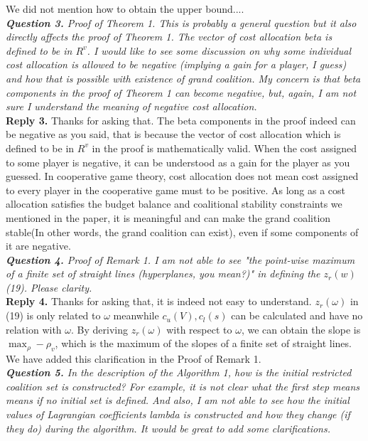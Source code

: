 \documentclass[11pt]{article}
\begin{document}
We did not mention how to obtain the upper bound....
\\[4mm]
%
%
%
\noindent \textit{\textbf{Question 3.}
Proof of Theorem 1. This is probably a general question but it also directly affects the proof of Theorem 1. The vector of cost allocation beta is defined to be in $R^v$.
I would like to see some discussion on why some individual cost allocation is allowed to be negative (implying a gain for a player, I guess) and how that is possible with existence of grand coalition. My concern is that beta components in the proof of Theorem 1 can become negative, but, again, I am not sure I understand the meaning of negative cost allocation.}
\\[2mm]
\noindent \textbf{Reply 3.}
Thanks for asking that. The beta components in the proof indeed can be negative as you said, that is because the vector of cost allocation which is defined to be in $R^v$ in the proof is mathematically valid. When the cost assigned to some player is negative, it can be understood as a gain for the player as you guessed. In cooperative game theory, cost allocation does not mean cost assigned to every player in the cooperative game must to be positive. As long as a cost allocation satisfies the budget balance and coalitional stability constraints we mentioned in the paper, it is meaningful and can make the grand coalition stable(In other words, the grand coalition can exist), even if some components of it are negative.
\\[4mm]
%
%
%
\noindent \textit{\textbf{Question 4.}
Proof of Remark 1. I am not able to see "the point-wise maximum of a finite set of straight lines (hyperplanes, you mean?)" in defining the $z_r(w)$ (19). Please clarity.}
\\[2mm]
\noindent \textbf{Reply 4.}
Thanks for asking that, it is indeed not easy to understand.
$z_r(\omega)$ in (19) is only related to $\omega$ meanwhile $c_u(V), c_l(s)$ can be calculated and have no relation with $\omega$. By deriving $z_r(\omega)$ with respect to $\omega$, we can obtain the slope is $\max_\rho -\rho_v$, which is the maximum of the slopes of a finite set of straight lines. We have added this clarification in the Proof of Remark 1.
\\[4mm]
%
%
%
\noindent \textit{\textbf{Question 5.}
In the description of the Algorithm 1, how is the initial restricted coalition set is constructed? For example, it is not clear what the first step means means if no initial set is defined. And also, I am not able to see how the initial values of Lagrangian coefficients lambda is constructed and how they change (if they do) during the algorithm. It would be great to add some clarifications.}
\end{document}
